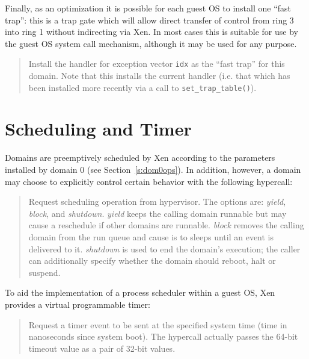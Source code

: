 \documentclass[11pt,twoside,final,openright]{xenstyle}
\begin{document}
Finally, as an optimization it is possible for each guest OS 
to install one ``fast trap'': this is a trap gate which will 
allow direct transfer of control from ring 3 into ring 1 without
indirecting via Xen. In most cases this is suitable for use by 
the guest OS system call mechanism, although it may be used for
any purpose. 


\begin{quote}

Install the handler for exception vector {\tt idx} as the ``fast
trap'' for this domain. Note that this installs the current handler 
(i.e. that which has been installed more recently via a call 
to {\tt set\_trap\_table()}). 

\end{quote}



\section{Scheduling and Timer}

Domains are preemptively scheduled by Xen according to the 
parameters installed by domain 0 (see Section~\ref{s:dom0ops}). 
In addition, however, a domain may choose to explicitly 
control certain behavior with the following hypercall: 

\begin{quote} 

Request scheduling operation from hypervisor. The options are: {\it
yield}, {\it block}, and {\it shutdown}.  {\it yield} keeps the
calling domain runnable but may cause a reschedule if other domains
are runnable.  {\it block} removes the calling domain from the run
queue and cause is to sleeps until an event is delivered to it.  {\it
shutdown} is used to end the domain's execution; the caller can
additionally specify whether the domain should reboot, halt or
suspend.
\end{quote} 

To aid the implementation of a process scheduler within a guest OS,
Xen provides a virtual programmable timer:

\begin{quote}

Request a timer event to be sent at the specified system time (time 
in nanoseconds since system boot). The hypercall actually passes the 
64-bit timeout value as a pair of 32-bit values. 

\end{quote} 
\end{document}
